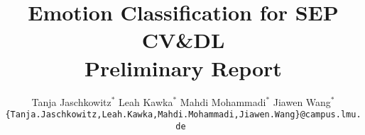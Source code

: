 \documentclass[10pt,twocolumn,letterpaper]{article}
\title{Emotion Classification for SEP CV\&DL \\ Preliminary Report}
\author{
Tanja Jaschkowitz$^{*}$
\quad
Leah Kawka$^{*}$
\quad
Mahdi Mohammadi$^{*}$
\quad
Jiawen Wang$^{*}$\\
\tt\small\{Tanja.Jaschkowitz,Leah.Kawka,Mahdi.Mohammadi,Jiawen.Wang\}@campus.lmu.de
}
\begin{document}
\maketitle
    
    

 
 
 
 
 
 
 
 

{
    \small
    
    
}

% 
\end{document}
